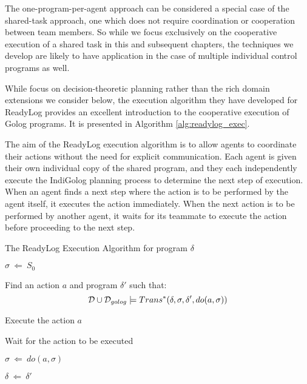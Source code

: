 The one-program-per-agent approach can be considered a special case
of the shared-task approach, one which does not require coordination
or cooperation between team members. So while we focus exclusively
on the cooperative execution of a shared task in this and subsequent
chapters, the techniques we develop are likely to have application
in the case of multiple individual control programs as well.

While \citeauthor{Ferrein2005readylog} focus on decision-theoretic
planning rather than the rich domain extensions we consider below,
the execution algorithm they have developed for ReadyLog provides
an excellent introduction to the cooperative execution of Golog programs.
It is presented in Algorithm \ref{alg:readylog_exec}.

The aim of the ReadyLog execution algorithm is to allow agents to
coordinate their actions without the need for explicit communication.
Each agent is given their own individual copy of the shared program,
and they each independently execute the IndiGolog planning process
to determine the next step of execution. When an agent finds a next
step where the action is to be performed by the agent itself, it executes
the action immediately. When the next action is to be performed by
another agent, it waits for its teammate to execute the action before
proceeding to the next step.

%
\begin{algorithm}[t]
 

\caption{The ReadyLog Execution Algorithm for program $\delta$}


\label{alg:readylog_exec} \begin{algorithmic}

\STATE $\sigma\ \Leftarrow\ S_{0}$


\STATE Find an action $a$ and program $\delta'$ such that:\[
\mathcal{D}\cup\mathcal{D}_{golog}\models Trans^{*}(\delta,\sigma,\delta',do(a,\sigma))\]



\STATE Execute the action $a$

\ELSE

\STATE Wait for the action to be executed

\ENDIF

\STATE $\sigma\ \Leftarrow\ do(a,\sigma)$

\STATE $\delta\ \Leftarrow\ \delta'$

\ENDWHILE

\end{algorithmic} 
\end{algorithm}


